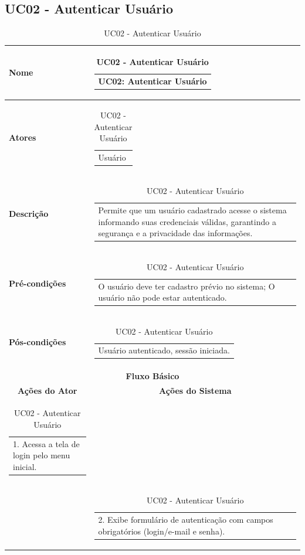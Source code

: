 \subsection{UC02 - Autenticar Usuário}

\begin{longtable}[c]{|p{}|p{}|}
\caption{UC02 - Autenticar Usuário}
\label{tab:uc02}\\
\hline
\multicolumn{1}{|p{0.48\textwidth}|}{\textbf{Nome}} &
  \begin{tabular}[c]{@{}p{}@{}}UC02: Autenticar Usuário\end{tabular} \\ \hline
\endfirsthead
\endhead
\multicolumn{1}{|p{0.48\textwidth}|}{\textbf{Atores}} &
  \begin{tabular}[c]{@{}p{}@{}}Usuário\end{tabular} \\ \hline
\multicolumn{1}{|p{0.48\textwidth}|}{\textbf{Descrição}} &
  \begin{tabular}[c]{@{}p{}@{}}Permite que um usuário cadastrado acesse o sistema informando suas credenciais válidas, garantindo a segurança e a privacidade das informações.\end{tabular} \\ \hline
\multicolumn{1}{|p{0.48\textwidth}|}{\textbf{Pré-condições}} &
  \begin{tabular}[c]{@{}p{}@{}}O usuário deve ter cadastro prévio no sistema; O usuário não pode estar autenticado.\end{tabular} \\ \hline
\multicolumn{1}{|p{0.48\textwidth}|}{\textbf{Pós-condições}} &
  \begin{tabular}[c]{@{}p{}@{}}Usuário autenticado, sessão iniciada.\end{tabular} \\ \hline
\multicolumn{2}{|c|}{\textbf{Fluxo Básico}} \\ \hline
\multicolumn{1}{|c|}{\textbf{Ações do Ator}} &
  \multicolumn{1}{c|}{\textbf{Ações do Sistema}} \\ \hline
\multicolumn{1}{|p{0.48\textwidth}|}{\begin{tabular}[c]{@{}p{}@{}}1. Acessa a tela de login pelo menu inicial.\end{tabular}} &
   \\ \hline
\multicolumn{1}{|p{0.48\textwidth}|}{} &
  \begin{tabular}[c]{@{}p{}@{}}2. Exibe formulário de autenticação com campos obrigatórios (login/e-mail e senha).\end{tabular} \\ \hline

\end{longtable}
